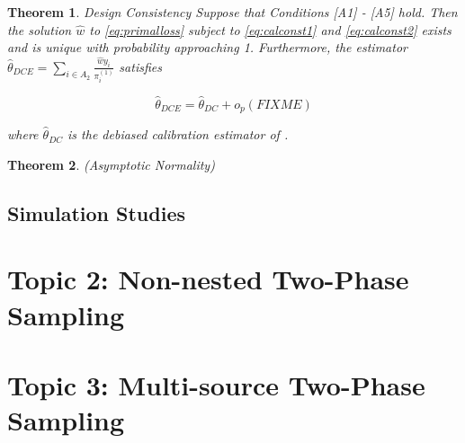 \documentclass[12pt]{article}
\newtheorem{theorem}{Theorem}
\begin{document}
\begin{theorem}{Design Consistency}
  Suppose that Conditions [A1] - [A5] hold. Then the solution $\hat w$ to 
  \ref{eq:primalloss} subject to \ref{eq:calconst1} and \ref{eq:calconst2} 
  exists and is unique with probability approaching 1. Furthermore, the
  estimator $\hat \theta_{DCE} = \sum_{i \in A_2} \frac{\hat w y_i}{\pi_i^{(1)}}$
  satisfies

  $$\hat \theta_{DCE} = \hat \theta_{DC} + o_p(FIXME)$$

  where $\hat \theta_{DC}$ is the debiased calibration estimator of 
  \cite{kwon2024debiased}.

\end{theorem}

\begin{theorem}(Asymptotic Normality)
\end{theorem}


\subsection*{Simulation Studies}


\section*{Topic 2: Non-nested Two-Phase Sampling}

\section*{Topic 3: Multi-source Two-Phase Sampling}

\printbibliography
\end{document}

